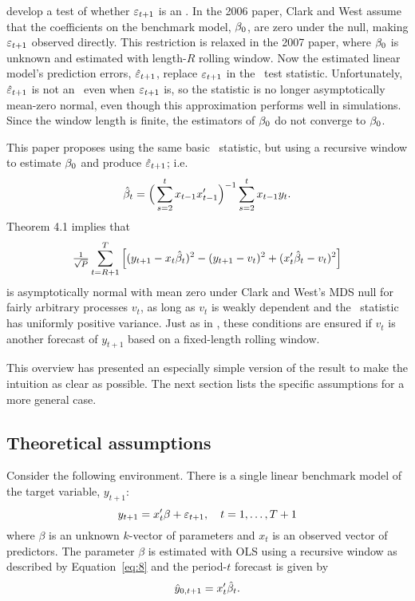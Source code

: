 \documentclass[12pt,fleqn]{article}
\begin{document}
\citet{ClW:06,ClW:07} develop a test of whether $\varepsilon_{t+1}$ is
an \mds. In the 2006 paper, Clark and West assume that the
coefficients on the benchmark model, $\btrue$, are zero under the null, making
$\varepsilon_{t+1}$ observed directly. This restriction is relaxed in
the 2007 paper, where $\btrue$ is unknown and estimated with length-$R$
rolling window. Now the estimated linear model's prediction errors,
$\hat{\varepsilon}_{t+1}$, replace $\varepsilon_{t+1}$ in the \oos\
test statistic. Unfortunately, $\hat{\varepsilon}_{t+1}$ is not an
\mds\ even when $\varepsilon_{t+1}$ is, so the statistic is no longer
asymptotically mean-zero normal, even though this approximation
performs well in simulations. Since the window length is finite,
the estimators of $\btrue$ do not converge to $\btrue$.

This paper proposes using the same basic \oos\ statistic,
but using a recursive window to estimate $\btrue$ and produce
$\hat{\varepsilon}_{t+1}$; i.e.
\begin{equation}
  \label{eq:8}
  \hat{\beta}_t = \Big(\sum_{s=2}^{t} x_{t-1} x_{t-1}'\Big)^{-1}
  \sum_{s=2}^t x_{t-1} y_t.
\end{equation}
 Theorem 4.1 implies that
\begin{equation*}
  \tfrac{1}{\sqrt{P}} \sum_{t=R+1}^T \Big[(y_{t+1} -
  x_t\hat{\beta}_t)^2 - (y_{t+1} - v_t)^2 + (x_t'\hat{\beta}_t - v_t)^2 \Big]
\end{equation*}
is asymptotically normal with mean zero under Clark and West's MDS
null for fairly
arbitrary processes $v_t$, as long as $v_t$ is weakly dependent and
the \oos\ statistic has uniformly positive variance.  Just as in
\citet{ClW:06,ClW:07}, these conditions are ensured if $v_t$ is
another forecast of $y_{t+1}$ based on a fixed-length rolling window.

This overview has presented an especially simple version of the result
to make the intuition as clear as possible. The next section lists the
specific assumptions for a more general case.

\subsection{Theoretical assumptions}
\label{sec:1a}

Consider the following environment. There is a single linear
benchmark model of the target variable, $y_{t+1}$:
\begin{equation}\label{eq:1}
  y_{t+1} = x_t'\beta + \varepsilon_{t+1}, \quad t = 1,\dots,T+1
\end{equation}
where $\beta$ is an unknown $k$-vector of parameters and $x_t$ is an
observed vector of predictors. The parameter $\beta$ is
estimated with OLS using a recursive window as described by
Equation~\eqref{eq:8}
and the period-$t$ forecast is given by
\begin{equation}\label{eq:3}
  \hat{y}_{0,t+1} = x_t'\hat{\beta}_t.
\end{equation}
\end{document}
